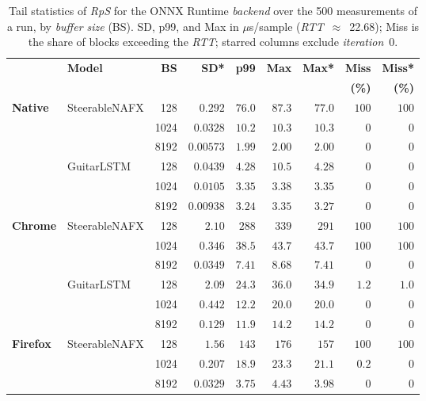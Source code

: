 \begin{table}[htbp]
\caption{Tail statistics of \emph{RpS} for the ONNX Runtime \emph{backend} over the 500 measurements of a run, by \emph{buffer size} (BS). SD, p99, and Max in $\mu$s/sample (\emph{RTT}~$\approx$~22.68); Miss is the share of blocks exceeding the \emph{RTT}; starred columns exclude \emph{iteration}~0.}
\label{tab:tails}
\centering
\setlength{\tabcolsep}{2pt}
\begin{tabular}{llrrrrrrr}
\toprule
& \textbf{Model} & \textbf{BS} & \textbf{SD*} & \textbf{p99} & \textbf{Max} & \textbf{Max*} & \textbf{Miss} & \textbf{Miss*} \\
& & & & & & & \textbf{(\%)} & \textbf{(\%)} \\
\midrule
  \multirow{6}{*}{\textbf{Native}} & \multirow{3}{*}{SteerableNAFX} & 128 & $0.292$ & $76.0$ & $87.3$ & $77.0$ & $100$ & $100$ \\
   &  & 1024 & $0.0328$ & $10.2$ & $10.3$ & $10.3$ & $0$ & $0$ \\
   &  & 8192 & $0.00573$ & $1.99$ & $2.00$ & $2.00$ & $0$ & $0$ \\
   & \multirow{3}{*}{GuitarLSTM} & 128 & $0.0439$ & $4.28$ & $10.5$ & $4.28$ & $0$ & $0$ \\
   &  & 1024 & $0.0105$ & $3.35$ & $3.38$ & $3.35$ & $0$ & $0$ \\
   &  & 8192 & $0.00938$ & $3.24$ & $3.35$ & $3.27$ & $0$ & $0$ \\
\midrule
  \multirow{6}{*}{\textbf{Chrome}} & \multirow{3}{*}{SteerableNAFX} & 128 & $2.10$ & $288$ & $339$ & $291$ & $100$ & $100$ \\
   &  & 1024 & $0.346$ & $38.5$ & $43.7$ & $43.7$ & $100$ & $100$ \\
   &  & 8192 & $0.0349$ & $7.41$ & $8.68$ & $7.41$ & $0$ & $0$ \\
   & \multirow{3}{*}{GuitarLSTM} & 128 & $2.09$ & $24.3$ & $36.0$ & $34.9$ & $1.2$ & $1.0$ \\
   &  & 1024 & $0.442$ & $12.2$ & $20.0$ & $20.0$ & $0$ & $0$ \\
   &  & 8192 & $0.129$ & $11.9$ & $14.2$ & $14.2$ & $0$ & $0$ \\
\midrule
  \multirow{6}{*}{\textbf{Firefox}} & \multirow{3}{*}{SteerableNAFX} & 128 & $1.56$ & $143$ & $176$ & $157$ & $100$ & $100$ \\
   &  & 1024 & $0.207$ & $18.9$ & $23.3$ & $21.1$ & $0.2$ & $0$ \\
   &  & 8192 & $0.0329$ & $3.75$ & $4.43$ & $3.98$ & $0$ & $0$ \\

\end{tabular}
\end{table}
